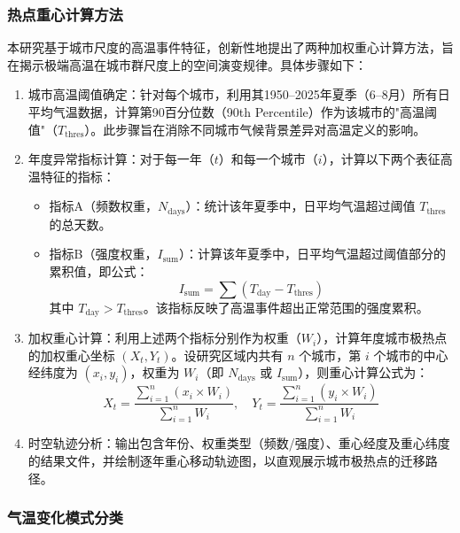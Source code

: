 \documentclass[a4paper,UTF8,scheme=chinese,zihao=-4,twoside]{ctexart}
\makeatletter
\newcommand{\初号}{\zihao{0}}
\newcommand{\小初}{\zihao{-0}}
\newcommand{\一号}{\zihao{1}}
\newcommand{\小一}{\zihao{-1}}
\newcommand{\二号}{\zihao{2}}
\newcommand{\小二}{\zihao{-2}}
\newcommand{\三号}{\zihao{3}}
\newcommand{\小三}{\zihao{-3}}
\newcommand{\四号}{\zihao{4}}
\newcommand{\小四}{\zihao{-4}}
\newcommand{\五号}{\zihao{5}}
\newcommand{\小五}{\zihao{-5}}
\newcommand{\六号}{\zihao{6}}
\newcommand{\小六}{\zihao{-6}}
\newcommand{\七号}{\zihao{7}}
\newcommand{\八号}{\zihao{8}}
\newcommand{\宋体}{\songti}
\newcommand{\黑体}{\heiti}
\newcommand{\仿宋}{\fangsong}
\newcommand{\楷书}{\kaishu}
\newcommand{\粗体}{\bfseries}
\newcommand{\斜体}{\itshape}
\newcommand\下划线[2][6em]{\hskip1pt\underline{\hb@xt@ #1{\hss#2\hss}}\hskip3pt}
\makeatother
\begin{document}
\subsubsection{热点重心计算方法}

本研究基于城市尺度的高温事件特征，创新性地提出了两种加权重心计算方法，旨在揭示极端高温在城市群尺度上的空间演变规律。具体步骤如下：

\begin{enumerate}
    \item 城市高温阈值确定：针对每个城市，利用其1950–2025年夏季（6–8月）所有日平均气温数据，计算第90百分位数（90th Percentile）作为该城市的"高温阈值"（$T_{\text{thres}}$）。此步骤旨在消除不同城市气候背景差异对高温定义的影响。
    \item 年度异常指标计算：对于每一年（$t$）和每一个城市（$i$），计算以下两个表征高温特征的指标：
        \begin{itemize}
            \item 指标A（频数权重，$N_{\text{days}}$）：统计该年夏季中，日平均气温超过阈值 $T_{\text{thres}}$ 的总天数。
            \item 指标B（强度权重，$I_{\text{sum}}$）：计算该年夏季中，日平均气温超过阈值部分的累积值，即公式：
                \begin{equation}
                I_{\text{sum}} = \sum (T_{\text{day}} - T_{\text{thres}})
                \end{equation}
                其中 $T_{\text{day}} > T_{\text{thres}}$。该指标反映了高温事件超出正常范围的强度累积。
        \end{itemize}
    \item 加权重心计算：利用上述两个指标分别作为权重（$W_i$），计算年度城市极热点的加权重心坐标 $(X_t, Y_t)$。设研究区域内共有 $n$ 个城市，第 $i$ 个城市的中心经纬度为 $(x_i, y_i)$，权重为 $W_i$（即 $N_{\text{days}}$ 或 $I_{\text{sum}}$），则重心计算公式为：
        \begin{equation}
        X_t = \frac{\sum_{i=1}^{n} (x_i \times W_i)}{\sum_{i=1}^{n} W_i}, \quad
        Y_t = \frac{\sum_{i=1}^{n} (y_i \times W_i)}{\sum_{i=1}^{n} W_i}
        \end{equation}
    \item 时空轨迹分析：输出包含年份、权重类型（频数/强度）、重心经度及重心纬度的结果文件，并绘制逐年重心移动轨迹图，以直观展示城市极热点的迁移路径。
\end{enumerate}

\subsubsection{气温变化模式分类}
\end{document}
